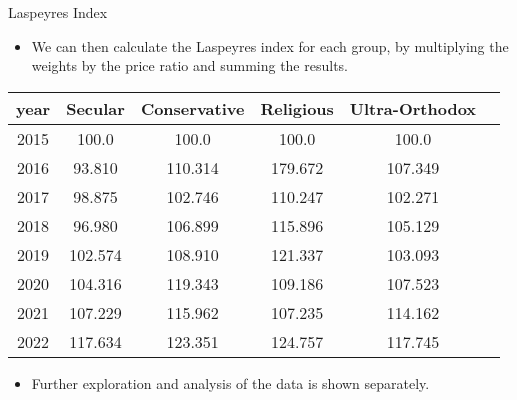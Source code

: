 \documentclass{beamer}
\begin{document}
\begin{frame}{Laspeyres Index}
    \begin{itemize}
        \item We can then calculate the Laspeyres index for each group, by multiplying the weights by the price ratio and summing the results.
    \end{itemize}
    \begin{table}
        \begin{tabular}{c c c c c c}
            \hline
            \textbf{year} & \textbf{Secular} & \textbf{Conservative} & \textbf{Religious} & \textbf{Ultra-Orthodox} \\
            \hline
            2015          & 100.0            & 100.0                 & 100.0              & 100.0                   \\
            \hline
            2016          & 93.810           & 110.314               & 179.672            & 107.349                 \\
            \hline
            2017          & 98.875           & 102.746               & 110.247            & 102.271                 \\
            \hline
            2018          & 96.980           & 106.899               & 115.896            & 105.129                 \\
            \hline
            2019          & 102.574          & 108.910               & 121.337            & 103.093                 \\
            \hline
            2020          & 104.316          & 119.343               & 109.186            & 107.523                 \\
            \hline
            2021          & 107.229          & 115.962               & 107.235            & 114.162                 \\
            \hline
            2022          & 117.634          & 123.351               & 124.757            & 117.745                 \\
            \hline
        \end{tabular}
    \end{table}
    \begin{itemize}
        \item Further exploration and analysis of the data is shown separately.
    \end{itemize}
\end{frame}
\end{document}

